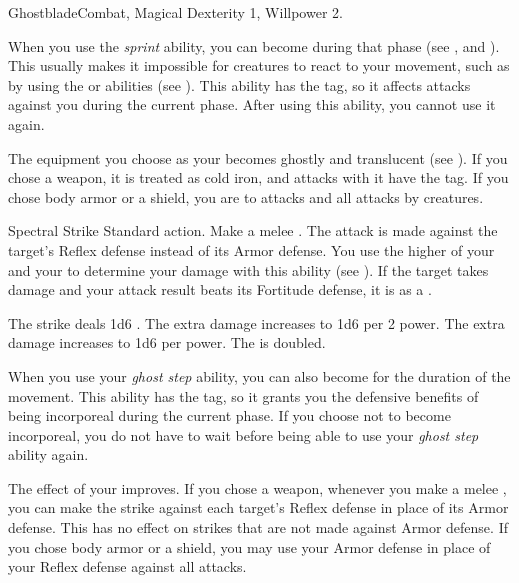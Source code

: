  \begin{magicalfeat}{Ghostblade}{Combat, Magical}
    \featpre Dexterity 1, Willpower 2.

     When you use the \textit{sprint} ability, you can become  during that phase (see , and ).
    This usually makes it impossible for creatures to react to your movement, such as by using the  or  abilities (see ).
    This ability has the  tag, so it affects attacks against you during the current phase.
    After using this ability, you  cannot use it again.

     The equipment you choose as your  becomes ghostly and translucent (see ).
    If you chose a weapon, it is treated as cold iron, and attacks with it have the \atCold tag.
    If you chose body armor or a shield, you are  to \atCold attacks and all attacks by  creatures.

    \begin{magicalactiveability}{Spectral Strike}
      \abilityusagetime Standard action.
      \rankline
      Make a melee .
      The attack is made against the target's Reflex defense instead of its Armor defense.
      You use the higher of your  and your  to determine your damage with this ability (see ).
      \hit If the target takes damage and your attack result beats its Fortitude defense, it is \slowed as a .

      \rankline
       The strike deals 1d6 .
       The extra damage increases to 1d6  per 2 power.
       The extra damage increases to 1d6  per power.
       The  is doubled.
    \end{magicalactiveability}

     When you use your \textit{ghost step} ability, you can also become  for the duration of the movement.
    This ability has the  tag, so it grants you the defensive benefits of being incorporeal during the current phase.
    If you choose not to become incorporeal, you do not have to wait  before being able to use your \textit{ghost step} ability again.

     The effect of your  improves.
    If you chose a weapon, whenever you make a melee , you can make the strike against each target's Reflex defense in place of its Armor defense.
    This has no effect on strikes that are not made against Armor defense.
    If you chose body armor or a shield, you may use your Armor defense in place of your Reflex defense against all attacks.
  \end{magicalfeat}

